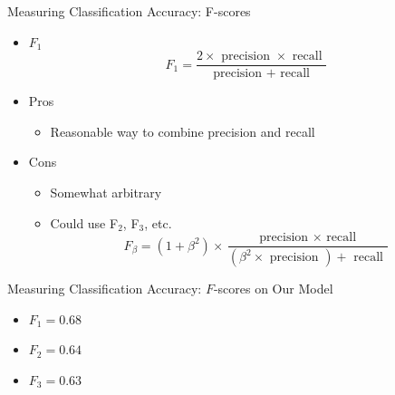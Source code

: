\documentclass[aspectratio=169]{beamer}
\begin{document}
\begin{frame}{Measuring Classification Accuracy: F-scores}

\begin{itemize}
\item $F_1$
	$$F_1 = \frac{2 \times \textrm{ precision } \times \textrm{ recall }}{\textrm{ precision } + \textrm{ recall }}$$
\item Pros
		\begin{itemize}
		\item Reasonable way to combine precision and recall	
		\end{itemize}
\item Cons
		\begin{itemize}
		\item Somewhat arbitrary
		\item Could use F$_2$, F$_3$, etc.
	$$F_\beta = (1 + \beta^2) \times \frac{\textrm{ precision } \times \textrm{ recall }}{(\beta^2\times\textrm{ precision }) + \textrm{ recall }}$$
		\end{itemize}
\end{itemize}
\end{frame}

\begin{frame}{Measuring Classification Accuracy: $F$-scores on Our Model}

\begin{itemize}
\item 	$F_1 = 0.68$
\item 	$F_2 = 0.64$
\item 	$F_3 = 0.63$
	
\end{itemize}
\end{frame}
\end{document}
